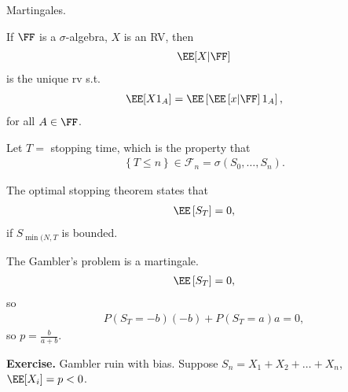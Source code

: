 \documentclass[12pt]{article}
\begin{document}
\begin{definition}
  \begin{definition}
    Martingales.
  \end{definition}

  \begin{definition}
    If $\FF$ is a $\sigma$-algebra, $X$ is an RV, then
    \begin{align*}
      \EE [X | \FF] 
    \end{align*}
    is the unique rv s.t.
    \begin{align*}
      \EE [X 1_A] = \EE\left[  \EE \left[ x | \FF \right] 1_A \right],
    \end{align*}
    for all $A \in \FF$.
  \end{definition}
\end{definition}

Let $T =$ stopping time, which is the property that
\begin{align*}
  \left\{ T \leq n \right\} \in \mathcal{F}_n = \sigma(S_0, \dots, S_n).
\end{align*}

The optimal stopping theorem states that
\begin{align*}
  \EE\left[ S_T \right] = 0,
\end{align*}
if $S_{\min(N, T}$ is bounded.

  The Gambler's problem is a martingale.
  \begin{align*}
    \EE\left[ S_T \right] = 0,
  \end{align*}
  so
  \begin{align*}
    P(S_T = -b)(-b) + P(S_T = a) a = 0,
  \end{align*}
  so $p = \frac{b}{a+b}$.

  {\bf Exercise.} Gambler ruin with bias. Suppose $S_n = X_1 + X_2 + \dots + X_n$, $\EE[X_i] = p < 0$.
\end{document}
